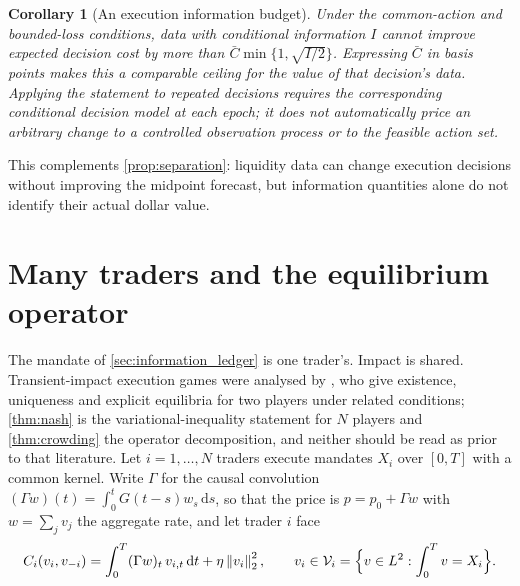 \documentclass[11pt]{article}
\newcommand{\norm}[1]{\left\lVert #1\right\rVert}
\numberwithin{equation}{section}
\newtheorem{corollary}[theorem]{Corollary}
\theoremstyle{definition}
\theoremstyle{remark}
\theoremstyle{definition}
\newcommand{\dd}{\,\mathrm d}
\begin{document}
\begin{corollary}[An execution information budget]\label{cor:budget}
Under the common-action and bounded-loss conditions, data with conditional
information $I$ cannot improve expected decision cost by more than
$\bar C\min\{1,\sqrt{I/2}\}$. Expressing $\bar C$ in basis points makes
this a comparable ceiling for the value of that decision's data. Applying
the statement to repeated decisions requires the corresponding conditional
decision model at each epoch; it does not automatically price an arbitrary
change to a controlled observation process or to the feasible action set.
\end{corollary}

This complements \cref{prop:separation}: liquidity data can change execution
decisions without improving the midpoint forecast, but information quantities
alone do not identify their actual dollar value.

\section{Many traders and the equilibrium operator}\label{sec:equilibrium}

The mandate of \cref{sec:information_ledger} is one trader's. Impact is shared.
Transient-impact execution games were analysed by \citet{schiedzhang2019}, who
give existence, uniqueness and explicit equilibria for two players under
related conditions; \cref{thm:nash} is the variational-inequality statement for
$N$ players and \cref{thm:crowding} the operator decomposition, and neither
should be read as prior to that literature. Let
$i=1,\dots,N$ traders execute mandates $X_i$ over $[0,T]$ with a common kernel.
Write $\Gamma$ for the causal convolution $(\Gamma w)(t)=\int_0^tG(t-s)w_s\dd s$,
so that the price is $p=p_0+\Gamma w$ with $w=\sum_jv_j$ the aggregate rate, and
let trader $i$ face
\begin{equation}\label{eq:gamecost}
 C_i(v_i,v_{-i})=\int_0^T(\Gamma w)_t\,v_{i,t}\dd t+\eta\norm{v_i}_2^2,
 \qquad v_i\in\mathcal V_i=\Bigl\{v\in L^2:\int_0^Tv=X_i\Bigr\}.
\end{equation}
\end{document}

